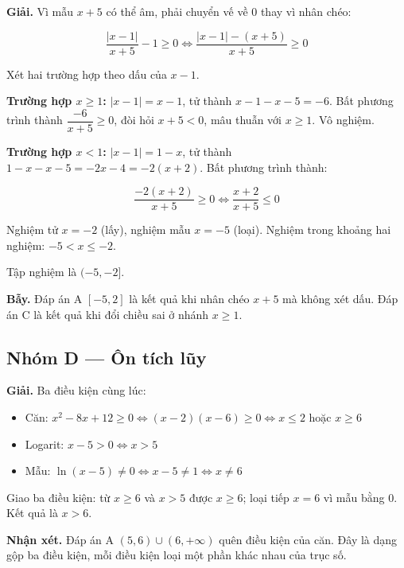 \documentclass[11pt, a4paper]{article}
\begin{document}
\begin{dapan}[23 — Đáp án D]
\textbf{Giải.} Vì mẫu $x + 5$ có thể âm, phải chuyển vế về $0$ thay vì nhân chéo:

$$\frac{|x-1|}{x+5} - 1 \ge 0 \iff \frac{|x-1| - (x+5)}{x+5} \ge 0$$

Xét hai trường hợp theo dấu của $x - 1$.

\textbf{Trường hợp $x \ge 1$:} $|x-1| = x - 1$, tử thành $x - 1 - x - 5 = -6$. Bất phương trình thành $\dfrac{-6}{x+5} \ge 0$, đòi hỏi $x + 5 < 0$, mâu thuẫn với $x \ge 1$. Vô nghiệm.

\textbf{Trường hợp $x < 1$:} $|x-1| = 1 - x$, tử thành $1 - x - x - 5 = -2x - 4 = -2(x+2)$. Bất phương trình thành:

$$\frac{-2(x+2)}{x+5} \ge 0 \iff \frac{x+2}{x+5} \le 0$$

Nghiệm tử $x = -2$ (lấy), nghiệm mẫu $x = -5$ (loại). Nghiệm trong khoảng hai nghiệm: $-5 < x \le -2$.

Tập nghiệm là $(-5, -2]$.

\textbf{Bẫy.} Đáp án A $[-5, 2]$ là kết quả khi nhân chéo $x + 5$ mà không xét dấu. Đáp án C là kết quả khi đổi chiều sai ở nhánh $x \ge 1$.
\end{dapan}

\subsection*{Nhóm D — Ôn tích lũy}

\begin{dapan}[24 — Đáp án D]
\textbf{Giải.} Ba điều kiện cùng lúc:

\begin{itemize}[leftmargin=1.4em, itemsep=2pt]
\item Căn: $x^2 - 8x + 12 \ge 0 \iff (x-2)(x-6) \ge 0 \iff x \le 2$ hoặc $x \ge 6$
\item Logarit: $x - 5 > 0 \iff x > 5$
\item Mẫu: $\ln(x-5) \ne 0 \iff x - 5 \ne 1 \iff x \ne 6$
\end{itemize}


Giao ba điều kiện: từ $x \ge 6$ và $x > 5$ được $x \ge 6$; loại tiếp $x = 6$ vì mẫu bằng $0$. Kết quả là $x > 6$.

\textbf{Nhận xét.} Đáp án A $(5,6) \cup (6,+\infty)$ quên điều kiện của căn. Đây là dạng gộp ba điều kiện, mỗi điều kiện loại một phần khác nhau của trục số.
\end{dapan}
\end{document}
